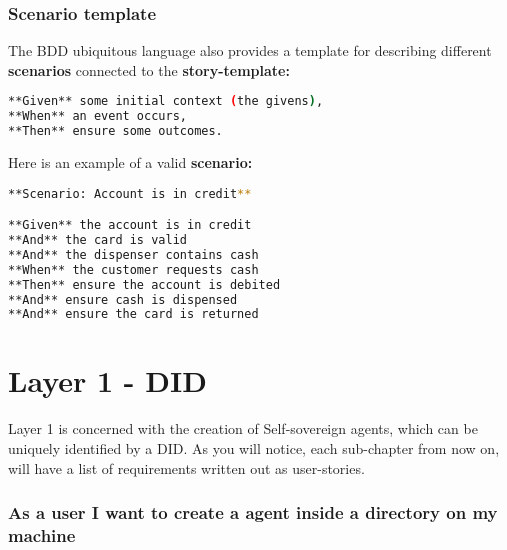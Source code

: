 \hypertarget{scenario-template}{%
\subsubsection{Scenario template}\label{scenario-template}}

The BDD ubiquitous language also provides a template for describing
different \textbf{scenarios} connected to the \textbf{story-template:}

\begin{lstlisting}[language=bash]
**Given** some initial context (the givens),  
**When** an event occurs,  
**Then** ensure some outcomes.
\end{lstlisting}

Here is an example of a valid \textbf{scenario:}

\begin{lstlisting}[language=bash]
**Scenario: Account is in credit**

**Given** the account is in credit
**And** the card is valid
**And** the dispenser contains cash
**When** the customer requests cash
**Then** ensure the account is debited
**And** ensure cash is dispensed
**And** ensure the card is returned
\end{lstlisting}



\pagebreak




\hypertarget{layer-1---did}{%
\section{Layer 1 - DID}\label{layer-1---did}}

Layer 1 is concerned with the creation of Self-sovereign agents, which
can be uniquely identified by a DID. As you will notice, each
sub-chapter from now on, will have a list of requirements written out as
user-stories.

\hypertarget{as-a-user-i-want-to-create-a-agent-inside-a-directory-on-my-machine}{%
\subsubsection{\texorpdfstring{\textbf{As a user I want to create a
agent inside a directory on my
machine}}{As a user I want to create a agent inside a directory on my machine}}\label{as-a-user-i-want-to-create-a-agent-inside-a-directory-on-my-machine}}

